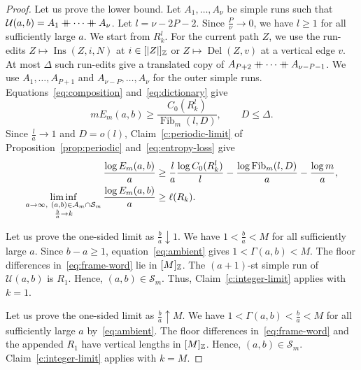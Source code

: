 \begin{proof}
Let us prove the lower bound. Let $A_1,\ldots,A_\nu$ be simple runs such that $\mathcal U(a,b)=A_1\mathbin{+\mkern-10mu+} \cdots\mathbin{+\mkern-10mu+} A_\nu$.
Let $l=\nu-2P-2$. Since $\frac P\nu\to0$, we have $l\ge1$ for all sufficiently large $a$.
We start from $R_k^l$. For the current path $Z$,
we use the run-edits $Z\mapsto\operatorname{Ins}(Z,i,N)$ at $i\in[|Z|]_{\mathbb Z}$
or $Z\mapsto\operatorname{Del}(Z,v)$ at a vertical edge $v$.
At most $\Delta$ such run-edits give a translated copy of $A_{P+2}\mathbin{+\mkern-10mu+} \cdots\mathbin{+\mkern-10mu+} A_{\nu-P-1}$.
We use $A_1,\ldots,A_{P+1}$ and $A_{\nu-P},\ldots,A_\nu$ for the outer simple runs. Equations~\eqref{eq:composition} and~\eqref{eq:dictionary} give
\[
 mE_m(a,b)\ge\frac{C_0(R_k^l)}{\operatorname{Fib}_m(l,D)},\qquad D\le\Delta.
\]
Since $\frac{l}{a}\to1$ and $D=o(l)$, Claim~\ref{c:periodic-limit} of Proposition~\ref{prop:periodic} and~\eqref{eq:entropy-loss} give
\[
\begin{aligned}
 \frac{\log E_m(a,b)}a
 &\ge\frac{l}{a}\frac{\log C_0(R_k^l)}l
 -\frac{\log \operatorname{Fib}_m(l,D)}a-\frac{\log m}a,\\
 \liminf_{\substack{a\to\infty,\ (a,b)\in\mathcal A_m\cap\mathcal S_m\\\frac{b}{a}\to k}}
 \frac{\log E_m(a,b)}a&\ge\ell(R_k).
\end{aligned}
\]

 Let us prove the one-sided limit as $\frac ba\downarrow1$. We have $1<\frac ba<M$ for all sufficiently large $a$.
Since $b-a\ge1$, equation~\eqref{eq:ambient} gives $1<\Gamma(a,b)<M$.
The floor differences in~\eqref{eq:frame-word} lie in $[M]_{\mathbb Z}$.
The $(a+1)$-st simple run of $\mathcal U(a,b)$ is $R_1$.
Hence, $(a,b)\in\mathcal S_m$.
Thus, Claim~\ref{c:integer-limit} applies with $k=1$.

 Let us prove the one-sided limit as $\frac ba\uparrow M$. We have $1<\Gamma(a,b)<\frac ba<M$ for all sufficiently large $a$ by~\eqref{eq:ambient}.
The floor differences in~\eqref{eq:frame-word} and the appended $R_1$ have vertical lengths in $[M]_{\mathbb Z}$.
Hence, $(a,b)\in\mathcal S_m$. Claim~\ref{c:integer-limit} applies with $k=M$.
\end{proof}

